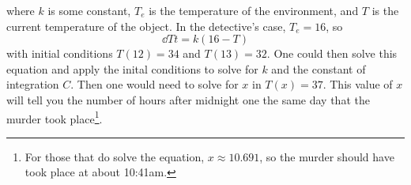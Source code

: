 \begin{enumerate}[label=\arabic*.]
\begin{equation*}
		\end{equation*}
		where $k$ is some constant, $T_e$ is the temperature of the environment, and $T$ is the current temperature of the object. In the detective's case, $T_e = 16$, so
		\begin{equation*}
			\dd{T}{t} = k(16-T)
		\end{equation*}
		with initial conditions $T(12) = 34$ and $T(13) = 32$. One could then solve this equation and apply the inital conditions to solve for $k$ and the constant of integration $C$. Then one would need to solve for $x$ in $T(x) = 37$. This value of $x$ will tell you the number of hours after midnight one the same day that the murder took place\footnote{For those that do solve the equation, $x \approx 10.691$, so the murder should have took place at about 10:41am.}.
		
\end{enumerate}